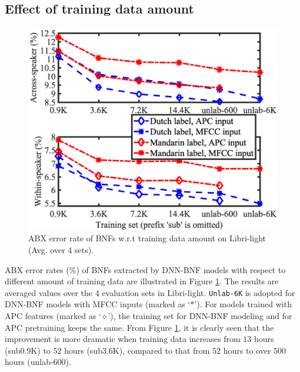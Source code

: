 \documentclass[a4paper]{article}
\begin{document}





\subsection{Effect of  training data amount}
\begin{figure}[!t]
    \centering
    \includegraphics[width=0.71\linewidth]{LaTeX/crsling_dnn_bnf_apc_input_vert_no_prefix.png}
    \caption{ABX error rate of BNFs w.r.t training data amount on Libri-light (Avg. over $4$ sets).}
    \label{fig:dnn_bnf_data_amount}
\end{figure}
ABX error rates ($\%$) of BNFs extracted by  DNN-BNF models with respect to different amount of training data are illustrated in Figure \ref{fig:dnn_bnf_data_amount}. The results are averaged values over the $4$ evaluation sets in  Libri-light. \texttt{Unlab-6K}  is  adopted for DNN-BNF models with MFCC inputs (marked as `$\ast$'). For models trained with APC features (marked as `$\diamond$'), the training set for DNN-BNF modeling and for APC pretraining keeps the same. From Figure \ref{fig:dnn_bnf_data_amount}, it is clearly seen that 
the improvement is more dramatic when training data increases from $13$  hours (sub0.9K) to $52$ hours (sub3.6K), compared to   that from $52$ hours to over $500$ hours (unlab-600). 
\end{document}

